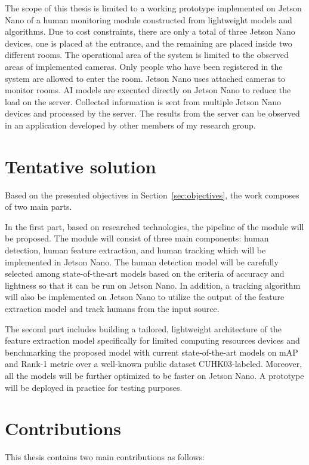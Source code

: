 \documentclass[../main.tex]{subfiles}
\begin{document}
The scope of this thesis is limited to a working prototype implemented on Jetson Nano of a human monitoring module constructed from lightweight models and algorithms. Due to cost constraints, there are only a total of three Jetson Nano devices, one is placed at the entrance, and the remaining are placed inside two different rooms. The operational area of the system is limited to the observed areas of implemented cameras. Only people who have been registered in the system are allowed to enter the room. Jetson Nano uses attached cameras to monitor rooms. AI models are executed directly on Jetson Nano to reduce the load on the server. Collected information is sent from multiple Jetson Nano devices and processed by the server. The results from the server can be observed in an application developed by other members of my research group.

\section{Tentative solution}
\label{sec:solution}
Based on the presented objectives in Section~\ref{sec:objectives}, the work composes of two main parts.

In the first part, based on researched technologies, the pipeline of the module will be proposed. The module will consist of three main components: human detection, human feature extraction, and human tracking which will be implemented in Jetson Nano. The human detection model will be carefully selected among state-of-the-art models based on the criteria of accuracy and lightness so that it can be run on Jetson Nano. In addition, a tracking algorithm will also be implemented on Jetson Nano to utilize the output of the feature extraction model and track humans from the input source.

The second part includes building a tailored, lightweight architecture of the feature extraction model specifically for limited computing resources devices and benchmarking the proposed model with current state-of-the-art models on mAP and Rank-1 metric over a well-known public dataset CUHK03-labeled. Moreover, all the models will be further optimized to be faster on Jetson Nano. A prototype will be deployed in practice for testing purposes.

\section{Contributions}
\label{sec:contribution}
This thesis contains two main contributions as follows:
\end{document}

